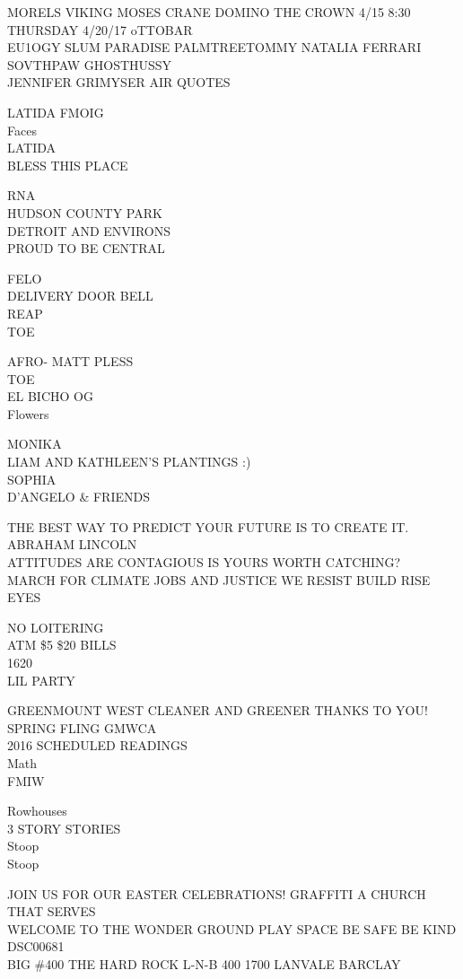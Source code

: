 \documentclass[10pt,letterpaper]{article}
\begin{document}
MORELS VIKING MOSES CRANE DOMINO THE CROWN 4/15 8:30\\
THURSDAY 4/20/17 oTTOBAR\\
EU1OGY SLUM PARADISE PALMTREETOMMY NATALIA FERRARI SOVTHPAW GHOSTHUSSY\\
JENNIFER GRIMYSER AIR QUOTES

LATIDA FMOIG\\
Faces\\
LATIDA\\
BLESS THIS PLACE

RNA\\
HUDSON COUNTY PARK\\
DETROIT AND ENVIRONS\\
PROUD TO BE CENTRAL

FELO\\
DELIVERY DOOR BELL\\
REAP\\
TOE

AFRO{-} MATT PLESS\\
TOE\\
EL BICHO OG\\
Flowers

MONIKA\\
LIAM AND KATHLEEN'S PLANTINGS :)\\
SOPHIA\\
D'ANGELO \& FRIENDS

THE BEST WAY TO PREDICT YOUR FUTURE IS TO CREATE IT. ABRAHAM LINCOLN\\
ATTITUDES ARE CONTAGIOUS IS YOURS WORTH CATCHING?\\
MARCH FOR CLIMATE JOBS AND JUSTICE WE RESIST BUILD RISE\\
EYES

NO LOITERING\\
ATM \$5 \$20 BILLS\\
1620\\
LIL PARTY

GREENMOUNT WEST CLEANER AND GREENER THANKS TO YOU!  SPRING FLING GMWCA\\
2016 SCHEDULED READINGS\\
Math\\
FMIW

Rowhouses\\
3 STORY STORIES\\
Stoop\\
Stoop

JOIN US FOR OUR EASTER CELEBRATIONS!  GRAFFITI A CHURCH THAT SERVES\\
WELCOME TO THE WONDER GROUND PLAY SPACE BE SAFE BE KIND\\
DSC00681\\
BIG \#400 THE HARD ROCK L{-}N{-}B 400 1700 LANVALE BARCLAY
\end{document}
